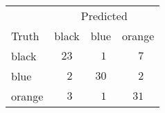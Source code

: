 \begin{tabular}{lccc}
\hline
 & \multicolumn{3}{c}{Predicted} \\ 
Truth  & black & blue & \multicolumn{1}{c}{orange} \\ 
\hline
black  & $23$ & $\phantom{0}1$ & $\phantom{0}7$ \\
blue  & $\phantom{0}2$ & $30$ & $\phantom{0}2$ \\
orange  & $\phantom{0}3$ & $\phantom{0}1$ & $31$ \\
\hline 
\end{tabular}
